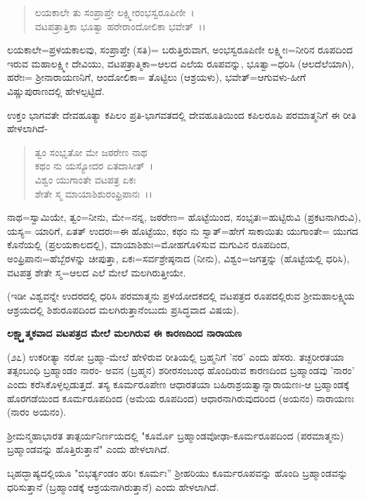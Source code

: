 \begin{verse}
ಲಯಕಾಲೇ ತು ಸಂಪ್ರಾಪ್ತೇ ಲಕ್ಷ್ಮೀರಂಭಸ್ವರೂಪಿಣೀ~।\\ ವಟಪತ್ರಾತ್ತಿಕಾ ಭೂತ್ವಾ ಹರೇರಾಂದೋಲಿಕಾ ಭವೇತ್~।।
\end{verse}


ಲಯಕಾಲೇ=ಪ್ರಳಯಕಾಲವು, ಸಂಪ್ರಾಪ್ತೇ (ಸತಿ)= ಬರುತ್ತಿರುವಾಗ, ಅಂಭಸ್ವರೂಪಿಣೀ ಲಕ್ಷ್ಮೀಃ=ನೀರಿನ ರೂಪದಿಂದ ಇರುವ ಮಹಾಲಕ್ಷ್ಮೀ ದೇವಿಯು, ವಟಪತ್ರಾತ್ಮಿಕಾ=ಆಲದ ಎಲೆಯ ರೂಪವನ್ನು, ಭೂತ್ವಾ=ಧರಿಸಿ (ಆಲದೆಲೆಯಾಗಿ), ಹರೇಃ= ಶ‍್ರೀನಾರಾಯಣನಿಗೆ, ಆಂದೋಲಿಕಾ= ತೊಟ್ಟಿಲು (ಆಶ್ರಯಳು), ಭವೇತ್=ಆಗುವಳು-ಹೀಗೆ ವಿಷ್ಣುಪುರಾಣದಲ್ಲಿ ಹೇಳಲ್ಪಟ್ಟಿದೆ.

ಉಕ್ತಂ ಭಾಗವತೇ ದೇವಹೂತ್ಯಾ ಕಪಿಲಂ ಪ್ರತಿ-ಭಾಗವತದಲ್ಲಿ ದೇವಹೂತಿಯಿಂದ ಕಪಿಲರೂಪಿ ಪರಮಾತ್ಮನಿಗೆ ಈ ರೀತಿ ಹೇಳಲಾಗಿದೆ-

\begin{verse}
ತ್ವಂ ಸಂಭೃತೋ ಮೇ ಜಠರೇಣ ನಾಥ\\ ಕಥಂ ನು ಯಸ್ಯೋದರ ಏತದಾಸೀತ್~।\\ ವಿಶ್ವಂ ಯುಗಾಂತೇ ವಟಪತ್ರ ಏಕಃ\\ ಶೇತೇ ಸ್ಮ ಮಾಯಾಶಿಶುರಂಫ್ರಿಪಾನಃ~।।
\end{verse}

ನಾಥ=ಸ್ವಾಮಿಯೇ, ತ್ವಂ=ನೀನು, ಮೇ=ನನ್ನ, ಜಠರೇಣ= ಹೊಟ್ಟೆಯಿಂದ, ಸಂಭೃತಃ=ಹುಟ್ಟಿರುವಿ (ಪ್ರಕಟನಾಗಿರುವಿ), ಯಸ್ಯ= ಯಾರಿಗೆ, ಏತತ್ ಉದರಃ=ಈ ಹೊಟ್ಟೆಯು, ಕಥಂ ನು ಸ್ವಾತ್=ಹೇಗೆ ಸಾಕಾಯಿತು ಯುಗಾಂತೇ= ಯುಗದ ಕೊನೆಯಲ್ಲಿ (ಪ್ರಲಯಕಾಲದಲ್ಲಿ), ಮಾಯಾಶಿಶುಃ=ಮೋಹಗೊಳಿಸುವ ಮಗುವಿನ ರೂಪದಿಂದ, ಅಂಫ್ರಿಪಾನಃ=ಹೆಬ್ಬೆರಳನ್ನು ಚೀಪುತ್ತಾ, ಏಕಃ=ಸರ್ವಶ್ರೇಷ್ಠನಾದ (ನೀನು), ವಿಶ್ವಂ=ಜಗತ್ತನ್ನು (ಹೊಟ್ಟೆಯಲ್ಲಿ ಧರಿಸಿ), ವಟಪತ್ರ ಶೇತೇ ಸ್ಮ=ಆಲದ ಎಲೆ ಮೇಲೆ ಮಲಗಿರುತ್ತೀಯೇ.

(ಇಡೀ ವಿಶ್ವವನ್ನೇ ಉದರದಲ್ಲಿ ಧರಿಸಿ ಪರಮಾತ್ಮನು ಪ್ರಳಯೋದಕದಲ್ಲಿ ವಟಪತ್ರದ ರೂಪದಲ್ಲಿರುವ ಶ‍್ರೀಮಹಾಲಕ್ಷ್ಮಿಯ ಆಶ್ರಯದಲ್ಲಿ ಶಿಶುರೂಪದಿಂದ ಮಲಗಿರುತ್ತಾನೆಂಬುದು ಪ್ರಸಿದ್ಧವಾದ ವಿಷಯ).

\begin{center}
\textbf{ಲಕ್ಷ್ಮ್ಯಾತ್ಮಕವಾದ ವಟಪತ್ರದ ಮೇಲೆ ಮಲಗಿರುವ ಈ ಕಾರಣದಿಂದ ನಾರಾಯಣ}
\end{center}

(೨೭) ಉಕರೀತ್ಯಾ ನರೋ ಬ್ರಹ್ಮಾ-ಮೇಲೆ ಹೇಳಿರುವ ರೀತಿಯಲ್ಲಿ ಬ್ರಹ್ಮನಿಗೆ 'ನರ' ಎಂದು ಹೆಸರು. ತಚ್ಛರೀರತಯಾ ತತ್ಸಂಬಂಧಿ ಬ್ರಹ್ಮಾಂಡಂ ನಾರಂ- ಅವನ (ಬ್ರಹ್ಮನ) ಶರೀರಸಂಬಂಧ ಹೊಂದಿರುವ ಕಾರಣದಿಂದ ಬ್ರಹ್ಮಾಂಡವು 'ನಾರಂ' ಎಂದು ಕರೆಸಿಕೊಳ್ಳಲ್ಪಡುತ್ತದೆ. ತಸ್ಯ ಕೂರ್ಮರೂಪೇಣ ಆಧಾರತಯಾ ಬಹಿರಾಶ್ರಯತ್ವಾನ್ನಾರಾಯಣಃ-ಆ ಬ್ರಹ್ಮಾಂಡಕ್ಕೆ ಹೊರಗಡೆಯಿಂದ ಕೂರ್ಮರೂಪದಿಂದ (ಅಮೆಯ ರೂಪದಿಂದ) ಆಧಾರನಾಗಿರುವುದರಿಂದ (ಅಯನಂ) ನಾರಾಯಣಃ (ನಾರಂ ಅಯನಂ).

 ಶ‍್ರೀಮನ್ಮಹಾಭಾರತ ತಾತ್ಪರ್ಯನಿರ್ಣಯದಲ್ಲಿ "ಕೂರ್ಮೊ ಬ್ರಹ್ಮಾಂಡವೋಢಾ-ಕೂರ್ಮರೂಪದಿಂದ (ಪರಮಾತ್ಮನು) ಬ್ರಹ್ಮಾಂಡವನ್ನು ಹೊತ್ತಿರುತ್ತಾನೆ" ಎಂದು ಹೇಳಲಾಗಿದೆ.

ಬೃಹದ್ಭಾಷ್ಯದಲ್ಲಿಯೂ "ಬಿಭರ್ತ್ಯಂಡಂ ಹರಿಃ ಕೂರ್ಮಃ'' ಶ‍್ರೀಹರಿಯು ಕೂರ್ಮರೂಪವನ್ನು ಹೊಂದಿ ಬ್ರಹ್ಮಾಂಡವನ್ನು ಧರಿಸುತ್ತಾನೆ (ಬ್ರಹ್ಮಾಂಡಕ್ಕೆ ಆಶ್ರಯನಾಗಿರುತ್ತಾನೆ) ಎಂದು ಹೇಳಲಾಗಿದೆ.

